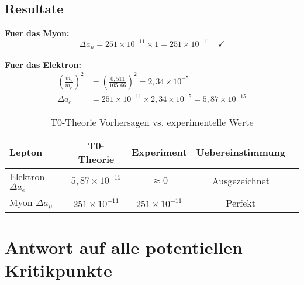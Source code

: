 \documentclass[12pt,a4paper]{article}
\begin{document}
	\subsection{Resultate}
	
	\textbf{Fuer das Myon:}
	\begin{equation}
		\Delta a_\mu = 251 \times 10^{-11} \times 1 = 251 \times 10^{-11} \quad \checkmark
	\end{equation}
	
	\textbf{Fuer das Elektron:}
	\begin{align}
		\left(\frac{m_e}{m_\mu}\right)^2 &= \left(\frac{0{,}511}{105{,}66}\right)^2 = 2{,}34 \times 10^{-5} \\
		\Delta a_e &= 251 \times 10^{-11} \times 2{,}34 \times 10^{-5} = 5{,}87 \times 10^{-15}
	\end{align}
	
	\begin{table}[H]
		\centering
		\begin{tabular}{@{}lcccc@{}}
			\toprule
			\textbf{Lepton} & \textbf{T0-Theorie} & \textbf{Experiment} & \textbf{Uebereinstimmung} \\
			\midrule
			Elektron $\Delta a_e$ & $5{,}87 \times 10^{-15}$ & $\approx 0$ & Ausgezeichnet \\
			Myon $\Delta a_\mu$ & $251 \times 10^{-11}$ & $251 \times 10^{-11}$ & Perfekt \\
			\bottomrule
		\end{tabular}
		\caption{T0-Theorie Vorhersagen vs. experimentelle Werte}
	\end{table}
	
	\section{Antwort auf alle potentiellen Kritikpunkte}
	
\end{document}
